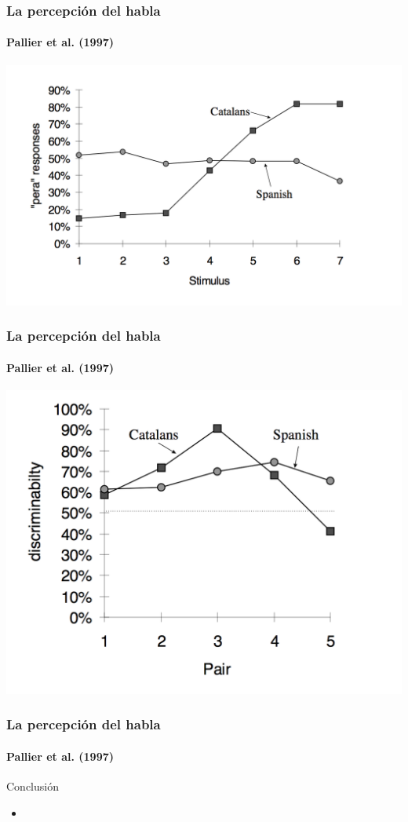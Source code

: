 \documentclass{beamer}
\begin{document}
\begin{frame} 
	\frametitle{La percepción del habla}
	\framesubtitle{Pallier et al. (1997)}
	
	\begin{center}
		\includegraphics[scale=.25]{figures/pallier1.png}
	\end{center}
\end{frame}

\begin{frame} 
	\frametitle{La percepción del habla}
	\framesubtitle{Pallier et al. (1997)}
	
	\begin{center}
		\includegraphics[scale=.25]{figures/pallier2.png}
	\end{center}
\end{frame}

\begin{frame} 
	\frametitle{La percepción del habla}
	\framesubtitle{Pallier et al. (1997)}
	
	Conclusión
	\begin{itemize}
		\item 
	\end{itemize}
\end{frame}
	
\end{document}
